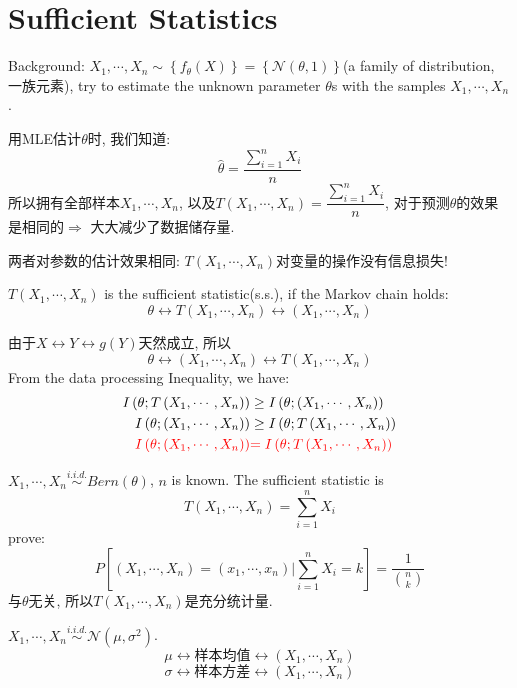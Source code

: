\section{Sufficient Statistics}
Background: $X_1,\cdots,X_n\sim \left\{f_{\theta}(X)\right\}=\left\{\mathcal{N}(\theta,1)\right\}$(a family of distribution, 一族元素), try to estimate the unknown parameter $\theta$s with the samples $X_1,\cdots,X_n$.

用MLE估计$\theta$时, 我们知道:
$$\hat{\theta} = \dfrac{\sum\limits_{i=1}^n X_i}{n}$$
所以拥有全部样本$X_1,\cdots,X_n$, 以及$T(X_1,\cdots,X_n)=\dfrac{\sum\limits_{i=1}^n X_i}{n}$, 对于预测$\theta$的效果是相同的$\Rightarrow$ 大大减少了数据储存量.

两者对参数的估计效果相同: $T(X_1,\cdots,X_n)$对变量的操作没有信息损失!

\begin{definition}
$T(X_1,\cdots,X_n)$ is the sufficient statistic(s.s.), if the Markov chain holds:
$$\theta\leftrightarrow T\left(X_1,\cdots,X_n\right)\leftrightarrow \left(X_1,\cdots,X_n\right)$$
\end{definition}
由于$X\leftrightarrow Y\leftrightarrow g(Y)$天然成立, 所以$$\theta\leftrightarrow \left(X_1,\cdots,X_n\right) \leftrightarrow T\left(X_1,\cdots,X_n\right)$$
From the data processing Inequality, we have:
\begin{align*}
I\left(\theta;T\left(X_1,\cdots,X_n\right)\right) &\geq I\left(\theta;\left(X_1,\cdots,X_n\right)\right) \\
I\left(\theta;\left(X_1,\cdots,X_n\right)\right) &\geq I\left(\theta;T\left(X_1,\cdots,X_n\right)\right) \\
\textcolor{red}{I\left(\theta;\left(X_1,\cdots,X_n\right)\right)} &\textcolor{red}{= I\left(\theta;T\left(X_1,\cdots,X_n\right)\right)}
\end{align*}

\begin{example}
$X_1,\cdots,X_n \stackrel{i.i.d.}{\sim} Bern(\theta)$, $n$ is known.
The sufficient statistic is
$$T(X_1,\cdots,X_n)=\sum_{i=1}^n X_i$$
prove:
$$P\left[(X_1,\cdots,X_n)=(x_1,\cdots,x_n)\big|\sum_{i=1}^nX_i=k\right]=\dfrac{1}{\binom{n}{k}}$$
与$\theta$无关, 所以$T(X_1,\cdots,X_n)$是充分统计量.
\end{example}

\begin{example}
$X_1,\cdots,X_n \stackrel{i.i.d.}{\sim} \mathcal{N}(\mu,\sigma^2)$.
$$\mu\leftrightarrow \text{样本均值} \leftrightarrow \left(X_1,\cdots,X_n\right)$$
$$\sigma\leftrightarrow \text{样本方差} \leftrightarrow \left(X_1,\cdots,X_n\right)$$
\end{example}

